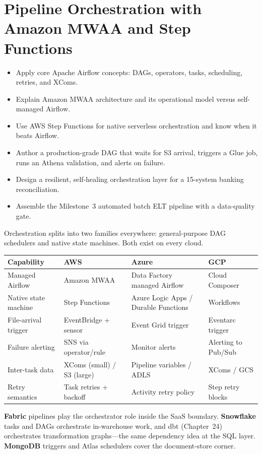 \chapter{Pipeline Orchestration with Amazon MWAA and Step Functions}
%
\begin{objectives}
\begin{itemize}
    \item Apply core Apache Airflow concepts: DAGs, operators, tasks, scheduling, retries, and XComs.
    \item Explain Amazon MWAA architecture and its operational model versus self-managed Airflow.
    \item Use AWS Step Functions for native serverless orchestration and know when it beats Airflow.
    \item Author a production-grade DAG that waits for S3 arrival, triggers a Glue job, runs an Athena validation, and alerts on failure.
    \item Design a resilient, self-healing orchestration layer for a 15-system banking reconciliation.
    \item Assemble the Milestone~3 automated batch ELT pipeline with a data-quality gate.
\end{itemize}
\end{objectives}

\begin{crosscloud}
Orchestration splits into two families everywhere: general-purpose DAG schedulers and native state machines. Both exist on every cloud.

\vspace{2mm}
{\footnotesize
\begin{tabular}{@{}p{2.8cm}p{3.0cm}p{3.0cm}p{3.0cm}@{}}
\toprule
\textbf{Capability} & \textbf{AWS} & \textbf{Azure} & \textbf{GCP} \\
\midrule
Managed Airflow & Amazon MWAA & Data Factory managed Airflow & Cloud Composer \\
Native state machine & Step Functions & Azure Logic Apps / Durable Functions & Workflows \\
File-arrival trigger & EventBridge + sensor & Event Grid trigger & Eventarc trigger \\
Failure alerting & SNS via operator/rule & Monitor alerts & Alerting to Pub/Sub \\
\addlinespace
Inter-task data & XComs (small) / S3 (large) & Pipeline variables / ADLS & XComs / GCS \\
Retry semantics & Task retries + backoff & Activity retry policy & Step retry blocks \\
\bottomrule
\end{tabular}}

\vspace{1mm}
\textbf{Fabric} pipelines play the orchestrator role inside the SaaS boundary. \textbf{Snowflake} tasks and DAGs orchestrate in-warehouse work, and dbt (Chapter~24) orchestrates transformation graphs---the same dependency idea at the SQL layer. \textbf{MongoDB} triggers and Atlas schedulers cover the document-store corner.
\end{crosscloud}

